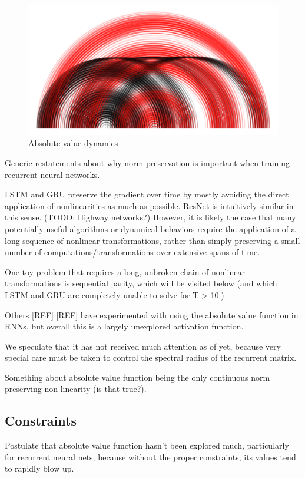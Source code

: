 \documentclass{article}
\begin{document}
\begin{figure}[hbtp]
\centering
\includegraphics[scale=0.25]{images/state-space2.png}
\caption{Absolute value dynamics}
\end{figure}

Generic restatements about why norm preservation is important when training recurrent neural networks.

LSTM and GRU preserve the gradient over time by mostly avoiding the direct application of nonlinearities as much as possible. ResNet is intuitively similar in this sense. (TODO: Highway networks?) However, it is likely the case that many potentially useful algorithms or dynamical behaviors require the application of a long sequence of nonlinear transformations, rather than simply preserving a small number of computations/transformations over extensive spans of time.

One toy problem that requires a long, unbroken chain of nonlinear transformations is sequential parity, which will be visited below (and which LSTM and GRU are completely unable to solve for T > 10.)

Others [REF] [REF] have experimented with using the absolute value function in RNNs, but overall this is a largely unexplored activation function.
 
We speculate that it has not received much attention as of yet, because very special care must be taken to control the spectral radius of the recurrent matrix.

Something about absolute value function being the only continuous norm preserving non-linearity (is that true?).

\subsection{Constraints}

Postulate that absolute value function hasn’t been explored much, particularly for recurrent neural nets, because without the proper constraints, its values tend to rapidly blow up.
\end{document}
